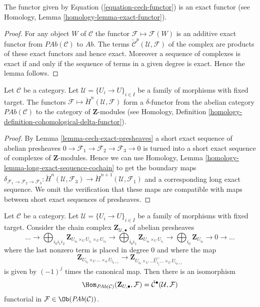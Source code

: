 \begin{lemma}
\label{lemma-cech-exact-presheaves}
The functor given by Equation (\ref{equation-cech-functor})
is an exact functor (see Homology, Lemma \ref{homology-lemma-exact-functor}).
\end{lemma}

\begin{proof}
For any object $W$ of $\mathcal{C}$ the functor
$\mathcal{F} \mapsto \mathcal{F}(W)$ is an additive exact functor
from $\textit{PAb}(\mathcal{C})$ to $\textit{Ab}$.
The terms $\check{\mathcal{C}}^p(\mathcal{U}, \mathcal{F})$
of the complex are products of these exact functors and hence exact.
Moreover a sequence of complexes is exact if and only if the sequence
of terms in a given degree is exact. Hence the lemma follows.
\end{proof}

\begin{lemma}
\label{lemma-cech-cohomology-delta-functor-presheaves}
Let $\mathcal{C}$ be a category.
Let $\mathcal{U} = \{U_i \to U\}_{i \in I}$ be a family of morphisms
with fixed target.
The functors $\mathcal{F} \mapsto \check{H}^n(\mathcal{U}, \mathcal{F})$
form a $\delta$-functor from the abelian category $\textit{PAb}(\mathcal{C})$
to the category of $\mathbf{Z}$-modules (see
Homology, Definition \ref{homology-definition-cohomological-delta-functor}).
\end{lemma}

\begin{proof}
By
Lemma \ref{lemma-cech-exact-presheaves}
a short exact sequence of abelian presheaves
$0 \to \mathcal{F}_1 \to \mathcal{F}_2 \to \mathcal{F}_3 \to 0$
is turned into a short exact sequence of complexes of
$\mathbf{Z}$-modules. Hence we can use
Homology, Lemma \ref{homology-lemma-long-exact-sequence-cochain}
to get the boundary maps
$\delta_{\mathcal{F}_1 \to \mathcal{F}_2 \to \mathcal{F}_3} :
\check{H}^n(\mathcal{U}, \mathcal{F}_3) \to
\check{H}^{n + 1}(\mathcal{U}, \mathcal{F}_1)$
and a corresponding long exact sequence. We omit the verification
that these maps are compatible with maps between short exact
sequences of presheaves.
\end{proof}

\begin{lemma}
\label{lemma-cech-map-into}
Let $\mathcal{C}$ be a category.
Let $\mathcal{U} = \{U_i \to U\}_{i \in I}$ be a family of morphisms
with fixed target.
Consider the chain complex $\mathbf{Z}_{\mathcal{U}, \bullet}$
of abelian presheaves
$$
\ldots
\to
\bigoplus_{i_0i_1i_2} \mathbf{Z}_{U_{i_0} \times_U U_{i_1} \times_U U_{i_2}}
\to
\bigoplus_{i_0i_1} \mathbf{Z}_{U_{i_0} \times_U U_{i_1}}
\to
\bigoplus_{i_0} \mathbf{Z}_{U_{i_0}}
\to 0 \to \ldots
$$
where the last nonzero term is placed in degree $0$
and where the map
$$
\mathbf{Z}_{U_{i_0} \times_U \ldots \times_u U_{i_{p + 1}}}
\longrightarrow
\mathbf{Z}_{U_{i_0} \times_U
\ldots \widehat{U_{i_j}} \ldots \times_U U_{i_{p + 1}}}
$$
is given by $(-1)^j$ times the canonical map.
Then there is an isomorphism
$$
\Hom_{\textit{PAb}(\mathcal{C})}(\mathbf{Z}_{{U}, \bullet}, \mathcal{F})
=
\check{\mathcal{C}}^\bullet(\mathcal{U}, \mathcal{F})
$$
functorial in $\mathcal{F} \in \Ob(\textit{PAb}(\mathcal{C}))$.
\end{lemma}

